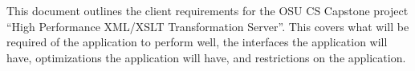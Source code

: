 This document outlines the client requirements for the OSU CS Capstone project ``High Performance XML/XSLT Transformation Server''.
This covers what will be required of the application to perform well, the interfaces the application will have, optimizations the application will have, and restrictions on the application.
